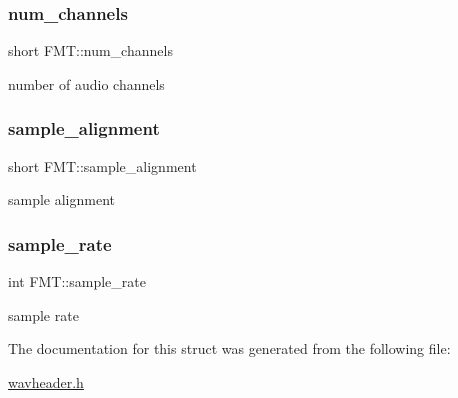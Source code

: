 \subsubsection{\texorpdfstring{num\+\_\+channels}{num\_channels}}
{\footnotesize\ttfamily short F\+M\+T\+::num\+\_\+channels}



number of audio channels 

\mbox{\label{structFMT_a276dd9ac6e17e65d816c7b54f76af43c}} 
\subsubsection{\texorpdfstring{sample\+\_\+alignment}{sample\_alignment}}
{\footnotesize\ttfamily short F\+M\+T\+::sample\+\_\+alignment}



sample alignment 

\mbox{\label{structFMT_ad09f55ae3078ca9c3545204c4b241910}} 
\subsubsection{\texorpdfstring{sample\+\_\+rate}{sample\_rate}}
{\footnotesize\ttfamily int F\+M\+T\+::sample\+\_\+rate}



sample rate 



The documentation for this struct was generated from the following file\+:\begin{DoxyCompactItemize}
\item 
\hyperlink{wavheader_8h}{wavheader.\+h}\end{DoxyCompactItemize}
